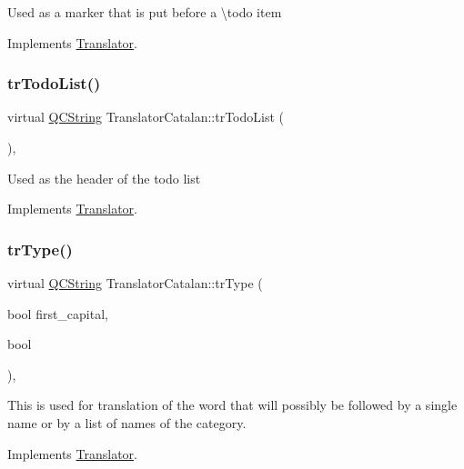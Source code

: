 Used as a marker that is put before a \textbackslash{}todo item 

Implements \mbox{\hyperlink{class_translator}{Translator}}.

\mbox{\label{class_translator_catalan_a6b9d1af41681da777c19afb85e63966c}} 
\subsubsection{\texorpdfstring{trTodoList()}{trTodoList()}}
{\footnotesize\ttfamily virtual \mbox{\hyperlink{class_q_c_string}{Q\+C\+String}} Translator\+Catalan\+::tr\+Todo\+List (\begin{DoxyParamCaption}{ }\end{DoxyParamCaption})\hspace{0.3cm}{\ttfamily [inline]}, {\ttfamily [virtual]}}

Used as the header of the todo list 

Implements \mbox{\hyperlink{class_translator}{Translator}}.

\mbox{\label{class_translator_catalan_a93e4888110b95d9f1a3f0fee4f2937c0}} 
\subsubsection{\texorpdfstring{trType()}{trType()}}
{\footnotesize\ttfamily virtual \mbox{\hyperlink{class_q_c_string}{Q\+C\+String}} Translator\+Catalan\+::tr\+Type (\begin{DoxyParamCaption}\item[{bool}]{first\+\_\+capital,  }\item[{bool}]{ }\end{DoxyParamCaption})\hspace{0.3cm}{\ttfamily [inline]}, {\ttfamily [virtual]}}

This is used for translation of the word that will possibly be followed by a single name or by a list of names of the category. 

Implements \mbox{\hyperlink{class_translator}{Translator}}.

\mbox{\label{class_translator_catalan_a6078622afd8bd3ed53d20254b849a311}} 
